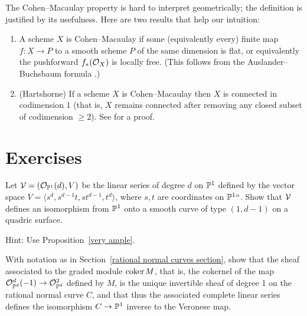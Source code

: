 \begin{fact}\label{meaning of ACM}
The Cohen--Macaulay property is hard to interpret geometrically; the definition is justified by its usefulness. Here are two results that help our intuition:
\begin{enumerate}
\item A scheme $X$ is Cohen--Macaulay if some (equivalently every) finite map $f: X\to P$ to a smooth scheme $P$
of the same dimension is 
%
flat, or equivalently the pushforward $f_*({\mathcal O}_X)$ is locally free. (This follows
from the 
Auslander--Buchsbaum formula
%
\cite[Section 19.3]{Eisenbud1995}.)
\item (Hartshorne) If a scheme $X$ is Cohen--Macaulay then $X$ is 
%
connected in codimension 1
(that is, $X$ remains connected after removing any 
closed subset of codimension $\geq 2$).
See 
\cite[Theorem 18.12]{Eisenbud1995} for a proof.
\vspace*{-1.4\baselineskip}
\end{enumerate}
\end{fact}

\section{Exercises}

\begin{exercise}\label{1,d-1 on quadric}
Let ${\mathcal V} =({\mathcal O}_{{\mathbb P}^1}(d), V)$ be the linear series of degree $d$ on ${\mathbb P}^1$ defined by the vector space 
$V = \langle s^{d},s^{d-1}t, st^{d-1}, t^d\rangle$, where $s,t$ are coordinates on ${\mathbb P}^1` `$. Show that ${\mathcal V}$ defines
an isomorphism from ${\mathbb P}^1$ onto a smooth curve 
of type $(1,d{-}1)$ on a quadric surface.

Hint: Use Proposition~\ref{very ample}.
\end{exercise}

\begin{exercise}\label{veronese inverse}
With notation as in Section~\ref{rational normal curves section}, show that the sheaf associated to the graded module ${\rm{coker}\kern1pt} M$,
that is, the cokernel of the map ${\mathcal O}_{{\mathbb P}^d}^d(-1) \to\nobreak 
{\mathcal O}_{{\mathbb P}^d}^2$ defined by $M$, is the unique invertible sheaf of degree 1
on the rational normal curve $C$, and that thus the associated complete linear series defines the isomorphism $C\to {\mathbb P}^1$ inverse
to the 
Veronese map.
%
\end{exercise}

